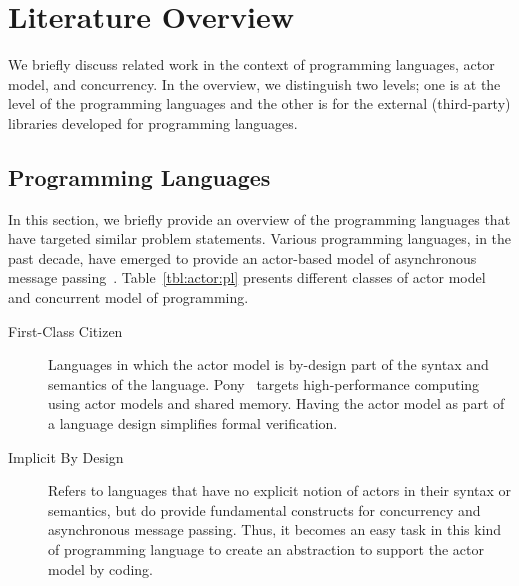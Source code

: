 \section{Literature Overview}
\label{sec:intro:rel}

We briefly discuss related work in the context of programming languages, actor model, and concurrency.
In the overview, we distinguish two levels; one is at the level of the programming languages and the other is for the external (third-party) libraries developed for programming languages.

\subsection{Programming Languages}
\label{sec:intro:proglangs}

In this section, we briefly provide an overview of the programming languages that have targeted similar problem statements.
Various programming languages, in the past decade, have emerged to provide an actor-based model of asynchronous message passing~\cite{philippsen2000survey}.
Table~\ref{tbl:actor:pl} presents different classes of actor model and concurrent model of programming.

\begin{description}
\item[First-Class Citizen]
Languages in which the actor model is by-design part of the syntax and 
semantics of the language.
Pony~\cite{ponylang,ClebschD13} targets high-performance 
computing using actor models and shared memory. 
Having the actor model as part of a language design simplifies formal verification.
\item[Implicit By Design]
Refers to languages that have no explicit notion of actors in their syntax or semantics, but do provide fundamental constructs for concurrency and asynchronous message passing.
Thus, it becomes an easy task in this kind of programming language to create an abstraction to support the actor model by coding.
\end{description}


